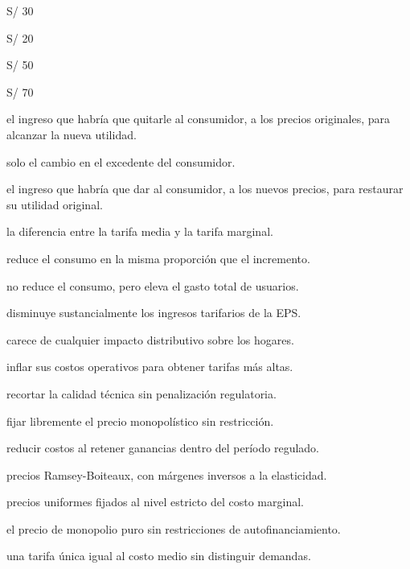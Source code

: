 \begin{opts}
    \item S/ 30
    \item S/ 20
    \item S/ 50
    \item S/ 70
\end{opts}

\begin{opts}
    \item el ingreso que habría que quitarle al consumidor, a los precios originales, para alcanzar la nueva utilidad.
    \item solo el cambio en el excedente del consumidor.
    \item el ingreso que habría que dar al consumidor, a los nuevos precios, para restaurar su utilidad original.
    \item la diferencia entre la tarifa media y la tarifa marginal.
\end{opts}

\begin{opts}
    \item reduce el consumo en la misma proporción que el incremento.
    \item no reduce el consumo, pero eleva el gasto total de usuarios.
    \item disminuye sustancialmente los ingresos tarifarios de la EPS.
    \item carece de cualquier impacto distributivo sobre los hogares.
\end{opts}

\begin{opts}
    \item inflar sus costos operativos para obtener tarifas más altas.
    \item recortar la calidad técnica sin penalización regulatoria.
    \item fijar libremente el precio monopolístico sin restricción.
    \item reducir costos al retener ganancias dentro del período regulado.
\end{opts}

\begin{opts}
    \item precios Ramsey-Boiteaux, con márgenes inversos a la elasticidad.
    \item precios uniformes fijados al nivel estricto del costo marginal.
    \item el precio de monopolio puro sin restricciones de autofinanciamiento.
    \item una tarifa única igual al costo medio sin distinguir demandas.
\end{opts}

